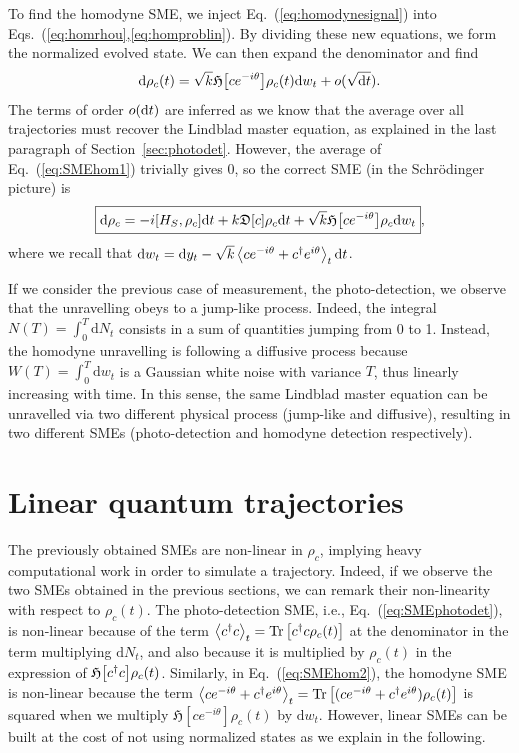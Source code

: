 To find the homodyne SME, we inject Eq.~(\ref{eq:homodynesignal}) into Eqs.~(\ref{eq:homrhou},\ref{eq:homproblin}). By dividing these new equations, we form the normalized evolved state. We can then expand the denominator and find
\begin{equation}{\label{eq:SMEhom1}}
    \mathrm{d}\rho_c(t) = \sqrt{k}\mathfrak{H}\qty[ce^{-i\theta}]\rho_c(t) \mathrm{d}w_t + o(\sqrt{\mathrm{d}t}).
\end{equation}
The terms of order $o(\mathrm{d}t)$ are inferred as we know that the average over all trajectories must recover the Lindblad master equation, as explained in the last paragraph of Section~\ref{sec:photodet}. However, the average of Eq.~(\ref{eq:SMEhom1}) trivially gives $0$, so the correct SME (in the Schrödinger picture) is
\begin{align}\label{eq:SMEhom2}
    \boxed{\mathrm{d}\rho_c=-i\qty[H_S,\rho_c]\mathrm{d}t + k\mathfrak{D}[c]\rho_c\mathrm{d}t + \sqrt{k}\mathfrak{H}\qty[ce^{-i\theta}]\rho_c\mathrm{d}w_t},
\end{align}
where we recall that $\mathrm{d}w_t=\mathrm{d}y_t - \sqrt{k}\expval{ce^{-i\theta}+c^\dagger e^{i\theta}}_t \mathrm{d}t$. 

If we consider the previous case of measurement, the photo-detection, we observe that the unravelling obeys to a jump-like process. Indeed, the integral $N(T)=\int_0^T \mathrm{d}N_t$ consists in a sum of quantities jumping from 0 to 1. Instead, the homodyne unravelling is following a diffusive process because $W(T)=\int_0^T \mathrm{d}w_t$ is a Gaussian white noise with variance $T$, thus linearly increasing with time. In this sense, the same Lindblad master equation can be unravelled via two different physical process (jump-like and diffusive), resulting in two different SMEs (photo-detection and homodyne detection respectively).
\section{Linear quantum trajectories}\label{sec:Linear}
The previously obtained SMEs are non-linear in $\rho_c$, implying heavy computational work in order to simulate a trajectory. Indeed, if we observe the two SMEs obtained in the previous sections, we can remark their non-linearity with respect to $\rho_c(t)$. The photo-detection SME, i.e., Eq.~(\ref{eq:SMEphotodet}), is non-linear because of the term $\expval{c^\dagger c}_t=\operatorname{Tr}\left[c^\dagger c \rho_c(t)\right]$ at the denominator in the term multiplying $\mathrm{d}N_t$, and also because it is multiplied by $\rho_c(t)$ in the expression of $\mathfrak{H}\qty[c^\dagger c]\rho_c(t)$. Similarly, in Eq.~(\ref{eq:SMEhom2}), the homodyne SME is non-linear because the term $\expval{ce^{-i\theta}+c^\dagger e^{i\theta}}_t=\operatorname{Tr}\left[(ce^{-i\theta}+c^\dagger e^{i\theta})\rho_c(t)\right]$ is squared when we multiply $\mathfrak{H}[ce^{-i\theta}]\rho_c(t)$ by $\mathrm{d}w_t$. However, linear SMEs can be built at the cost of not using normalized states as we explain in the following.
 
